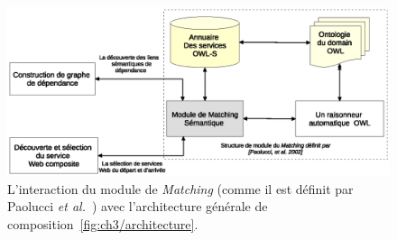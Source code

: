 \begin{figure}[h]
    \centering
    \includegraphics[width=1.18\textwidth, center]{figs/ch3/matchmaker.eps}
    \caption{L'interaction du module de \emph{Matching} (comme il est
      définit par Paolucci \emph{et al.}~\cite{paolucci2002semantic})
      avec l'architecture générale de
      composition~\ref{fig:ch3/architecture}.}
    \label{fig:ch3/matchmaker}
\end{figure}
